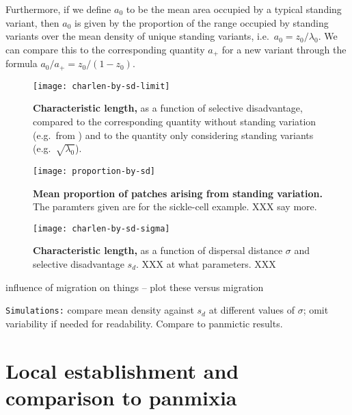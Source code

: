 \documentclass{article}
\begin{document}
Furthermore, if we define $a_0$ to be the mean area occupied by a typical standing variant, 
then $a_0$ is given by the proportion of the range occupied by standing variants over the mean density of unique standing variants,
i.e.\ $a_0 = z_0 / \lambda_0$.
We can compare this to the corresponding quantity $a_+$ for a new variant through the formula
$a_0 / a_+ = z_0 / (1-z_0)$.

\begin{figure}[ht]
\begin{center}
  \texttt{[image: charlen-by-sd-limit]}
\caption{ %
{\bf Characteristic length,} as a function of selective disadvantage, compared to the corresponding quantity without standing variation (e.g.\ from \cite{ralphcoop2010}) and to the quantity only considering standing variants (e.g.\ $\sqrt{\lambda_0}$).
}
\end{center}
\end{figure}

\begin{figure}[ht]
\begin{center}
  \texttt{[image: proportion-by-sd]}
\caption{ %
{\bf Mean proportion of patches arising from standing variation.} The paramters given are for the sickle-cell example.  XXX say more.
}
\end{center}
\end{figure}

\begin{figure}[ht]
\begin{center}
  \texttt{[image: charlen-by-sd-sigma]}
\caption{ %
{\bf Characteristic length,} as a function of dispersal distance $\sigma$ and selective disadvantage $s_d$.  XXX at what parameters. XXX
}
\end{center}
\end{figure}


influence of migration on things -- plot these versus migration 

{\tt Simulations:} compare mean density against $s_d$ at different values of $\sigma$; omit variability if needed for readability.
Compare to panmictic results.


\section{Local establishment and comparison to panmixia}
\end{document}
